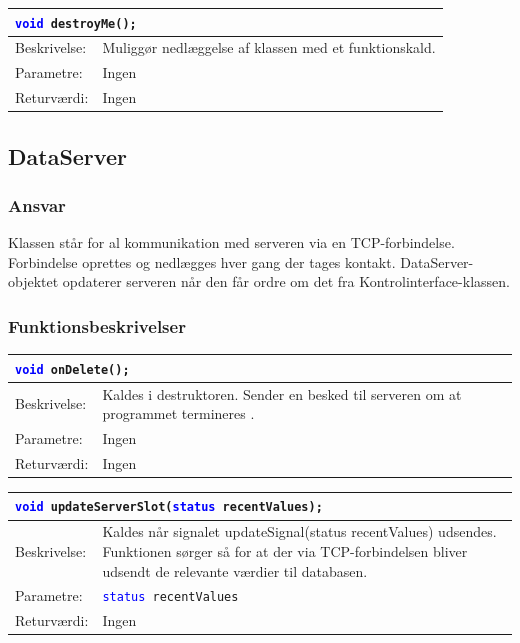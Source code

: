 \begin{table}[H]
\begin{tabular}{l p{12.5cm}}
\multicolumn{2}{l}{\texttt{\textcolor{blue}{void} destroyMe();}} \\
\hline
Beskrivelse: &Muliggør nedlæggelse af klassen med et funktionskald.\\
Parametre:&Ingen\\
Returværdi:&Ingen\\
\end{tabular}
\end{table}

\subsection{DataServer}
\subsubsection{Ansvar}
Klassen står for al kommunikation med serveren via en TCP-forbindelse. Forbindelse oprettes og nedlægges hver gang der tages kontakt. DataServer-objektet opdaterer serveren når den får ordre om det fra Kontrolinterface-klassen.
\subsubsection{Funktionsbeskrivelser}

\begin{table}[H]
\begin{tabular}{l p{12.5cm}}
\multicolumn{2}{l}{\texttt{\textcolor{blue}{void} onDelete();}} \\
\hline
Beskrivelse: &Kaldes i destruktoren. Sender en besked til serveren om at programmet termineres	.\\
Parametre:&Ingen\\
Returværdi:&Ingen\\
\end{tabular}
\end{table}

\begin{table}[H]
\begin{tabular}{l p{12.5cm}}
\multicolumn{2}{l}{\texttt{\textcolor{blue}{void} updateServerSlot(\textcolor{blue}{status} recentValues);}} \\
\hline
Beskrivelse: &Kaldes når signalet updateSignal(status recentValues) udsendes. Funktionen sørger så for at der via TCP-forbindelsen bliver udsendt de relevante værdier til databasen.\\
Parametre:&\texttt{\textcolor{blue}{status} recentValues}\\
Returværdi:&Ingen\\
\end{tabular}
\end{table}

